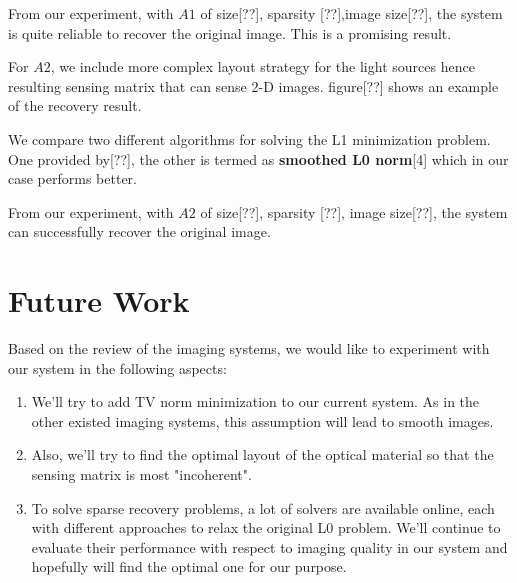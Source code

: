 \documentclass{article} %
\begin{document}
From our experiment, with $A1$ of size[??], sparsity [??],image size[??], the system is quite reliable to recover the original image. This is a promising result.

For $A2$, we include more complex layout strategy for the light sources hence resulting sensing matrix that can sense 2-D images. figure[??] shows an example of the recovery result.

We compare two different algorithms for solving the L1 minimization problem. One provided by[??], the other is termed as \textbf{smoothed L0 norm}[4] which in our case performs better.

From our experiment, with $A2$ of size[??], sparsity [??], image size[??], the system can successfully recover the original image. 

\section{Future Work}
Based on the review of the imaging systems, we would like to experiment with our system in the following aspects:

\begin{enumerate}
\item We'll try to add TV norm minimization to our current system. As in the other existed imaging systems, this assumption will lead to smooth images.
\item Also, we'll try to find the optimal layout of the optical material so that the sensing matrix is most "incoherent". 
\item To solve sparse recovery problems, a lot of solvers are available online, each with different approaches to relax the original L0 problem. We'll continue to evaluate their performance with respect to imaging quality in our system and hopefully will find the optimal one for our purpose.
\end{enumerate}

\vspace*{3\baselineskip}
\end{document}

